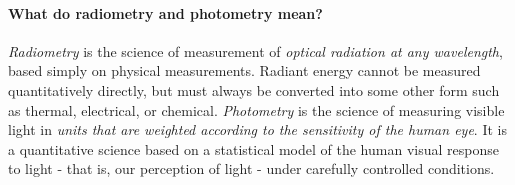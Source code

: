 \paragraph{What do radiometry and photometry mean?} 

\textit{Radiometry} is the science of measurement of \textit{optical radiation at any wavelength}, based simply on physical measurements. Radiant energy cannot be measured quantitatively directly, but must always be converted into some other form such as thermal, electrical, or chemical. 
\textit{Photometry} is the science of measuring visible light in \textit{units that are weighted according to the sensitivity of the human eye}. It is a quantitative science based on a statistical model of the human visual response to light - that is, our perception of light - under carefully controlled conditions.



